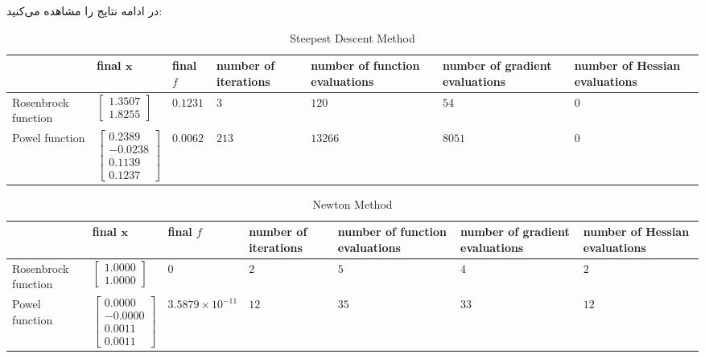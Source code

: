 \documentclass[a4paper]{article}
\theoremstyle{plain}
\theoremstyle{definition}
\theoremstyle{remark}
\begin{document}
در ادامه نتایج را مشاهده می‌کنید:
\begin{latin}
	\begin{table}[h]
		\centering
		\sffamily \begin{tabularx}{1\textwidth}{|>{\centering\arraybackslash}m{2cm}|>{\centering\arraybackslash}m{2cm}|>{\centering\arraybackslash}m{2cm}|>{\centering\arraybackslash}m{2cm}|>{\centering\arraybackslash}m{2cm}|>{\centering\arraybackslash}m{2cm}|>{\centering\arraybackslash}m{1.95cm}|}
			\hline
			& final $\mathbf{x}$ & final $f$ & number of iterations & number of function evaluations & number of gradient evaluations & number of Hessian evaluations\\
			\hline
			\rule{0pt}{20pt} Rosenbrock function & $\begin{bmatrix}
			1.3507\\
			1.8255
			\end{bmatrix}$  & $0.1231$   &  $3$  &  $120$  &  $54$  &  $0$  \\
			\hline
			\rule{0pt}{30pt}Powel function & $\begin{bmatrix}
			0.2389\\
			-0.0238\\
			0.1139\\
			0.1237
			\end{bmatrix}$  & $0.0062$   &  $213$  & $13266$   &  $8051$  & $0$   \\
			\hline
		\end{tabularx} \normalfont
		\caption{Steepest Descent Method}
	\end{table}
	\begin{table}[h]
		\centering
		\sffamily \begin{tabularx}{1\textwidth}{|>{\centering\arraybackslash}m{1.7cm}|>{\centering\arraybackslash}m{2.4cm}|>{\centering\arraybackslash}m{2cm}|>{\centering\arraybackslash}m{2cm}|>{\centering\arraybackslash}m{2cm}|>{\centering\arraybackslash}m{2cm}|>{\centering\arraybackslash}m{1.85cm}|}
			\hline
			& final $\mathbf{x}$ & final $f$ & number of iterations & number of function evaluations & number of gradient evaluations & number of Hessian evaluations\\
			\hline
			\rule{0pt}{5pt} Rosenbrock function & $\begin{bmatrix}
			1.0000\\ 1.0000
			\end{bmatrix}$  &\small $0$\normalsize   &  $2$  &  $5$  &  $4$  &  $2$  \\
			
			\hline
			\rule{0pt}{30pt}Powel function & \footnotesize$\begin{bmatrix}
			0.0000\\
			-0.0000\\
			0.0011\\
			0.0011
			\end{bmatrix}$\normalsize  &  \small$   3.5879\times10^{-11}$ \normalsize & $12$   & $35$   &  $33$  & $12$   \\
			\hline
		\end{tabularx} \normalfont
		\caption{Newton Method}
	\end{table}
\end{latin}
\end{document}
